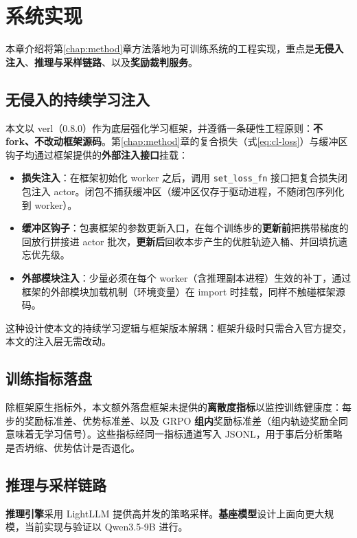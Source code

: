 \chapter{系统实现}
\label{chap:system}

本章介绍将第\ref{chap:method}章方法落地为可训练系统的工程实现，重点是\textbf{无侵入注入}、\textbf{推理与采样链路}、以及\textbf{奖励裁判服务}。

\section{无侵入的持续学习注入}

本文以 verl（0.8.0）作为底层强化学习框架，并遵循一条硬性工程原则：\textbf{不 fork、不改动框架源码}。第\ref{chap:method}章的复合损失（式\ref{eq:cl-loss}）与缓冲区钩子均通过框架提供的\textbf{外部注入接口}挂载：

\begin{itemize}
  \item \textbf{损失注入}：在框架初始化 worker 之后，调用 \texttt{set\_loss\_fn} 接口把复合损失闭包注入 actor。闭包不捕获缓冲区（缓冲区仅存于驱动进程，不随闭包序列化到 worker）。
  \item \textbf{缓冲区钩子}：包裹框架的参数更新入口，在每个训练步的\textbf{更新前}把携带梯度的回放行拼接进 actor 批次，\textbf{更新后}回收本步产生的优胜轨迹入桶、并回填抗遗忘优先级。
  \item \textbf{外部模块注入}：少量必须在每个 worker（含推理副本进程）生效的补丁，通过框架的外部模块加载机制（环境变量）在 import 时挂载，同样不触碰框架源码。
\end{itemize}

这种设计使本文的持续学习逻辑与框架版本解耦：框架升级时只需合入官方提交，本文的注入层无需改动。

\section{训练指标落盘}

除框架原生指标外，本文额外落盘框架未提供的\textbf{离散度指标}以监控训练健康度：每步的奖励标准差、优势标准差、以及 GRPO \textbf{组内}奖励标准差（组内轨迹奖励全同意味着无学习信号）。这些指标经同一指标通道写入 JSONL，用于事后分析策略是否坍缩、优势估计是否退化。

\section{推理与采样链路}

\textbf{推理引擎}采用 LightLLM 提供高并发的策略采样。\textbf{基座模型}设计上面向更大规模，当前实现与验证以 Qwen3.5-9B 进行。

